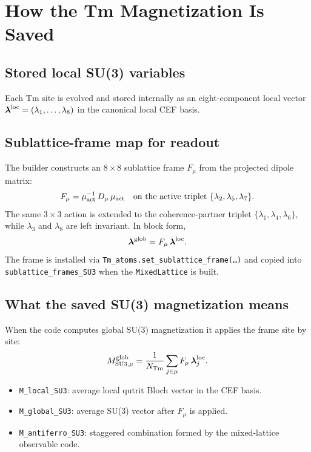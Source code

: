 \documentclass[11pt]{article}
\begin{document}
\section{How the Tm Magnetization Is Saved}
\label{sec:readout}

\subsection{Stored local SU(3) variables}

Each Tm site is evolved and stored internally as an eight-component
local vector $\boldsymbol{\lambda}^{\rm loc} = (\lambda_1, \dots,
\lambda_8)$ in the canonical local CEF basis.

\subsection{Sublattice-frame map for readout}

The builder constructs an $8\times 8$ sublattice frame $F_\mu$ from
the projected dipole matrix:
\begin{equation}
F_\mu = \mu_{\rm act}^{-1}\,D_\mu\,\mu_{\rm act}
\quad\text{on the active triplet }\{\lambda_2,\lambda_5,\lambda_7\}.
\end{equation}
The same $3\times 3$ action is extended to the coherence-partner
triplet $\{\lambda_1,\lambda_4,\lambda_6\}$, while $\lambda_3$ and
$\lambda_8$ are left invariant.  In block form,
\begin{equation}
\boldsymbol{\lambda}^{\rm glob} = F_\mu\,\boldsymbol{\lambda}^{\rm loc}.
\end{equation}
The frame is installed via
\texttt{Tm\_atoms.set\_sublattice\_frame(\ldots)} and copied into
\texttt{sublattice\_frames\_SU3} when the \texttt{MixedLattice} is built.

\subsection{What the saved SU(3) magnetization means}

When the code computes global SU(3) magnetization it applies the frame
site by site:
\begin{equation}
M_{{\rm SU3},\mu}^{\rm glob} =
\frac{1}{N_{\rm Tm}}\sum_{j\in\mu} F_\mu\,\boldsymbol{\lambda}_j^{\rm loc}.
\end{equation}
\begin{itemize}
\item \texttt{M\_local\_SU3}: average local qutrit Bloch vector in the
  CEF basis.
\item \texttt{M\_global\_SU3}: average SU(3) vector after $F_\mu$ is
  applied.
\item \texttt{M\_antiferro\_SU3}: staggered combination formed by the
  mixed-lattice observable code.
\end{itemize}
\end{document}
